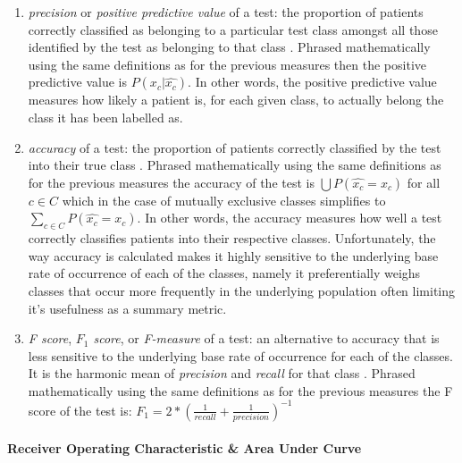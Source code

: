 \documentclass[]{article}
\begin{document}
\begin{enumerate}[label=\alph*)]
	\item \textit{precision} or \textit{positive predictive value} of a test: the proportion of patients correctly classified as belonging to a particular test class amongst all those identified by the test as belonging to that class \cite{Flach2004,Gung2013,Sokolova2009,Forman2010,VanAsch2013}. Phrased mathematically using the same definitions as for the previous measures then the positive predictive value is $P(x_c|\hat{x_c})$. In other words, the positive predictive value measures how likely a patient is, for each given class, to actually belong the class it has been labelled as.
	\item \textit{accuracy} of a test: the proportion of patients correctly classified by the test into their true class \cite{Flach2004,MedCalc2017,Sokolova2009,Forman2010,VanAsch2013}. Phrased mathematically using the same definitions as for the previous measures the accuracy of the test is $\bigcup P(\hat{x_c} = x_c)$ for all $c\in C$ which in the case of mutually exclusive classes simplifies to $\sum\limits_{c\in C}P(\hat{x_c} = x_c)$. In other words, the accuracy measures how well a test correctly classifies patients into their respective classes. Unfortunately, the way accuracy is calculated makes it highly sensitive to the underlying base rate of occurrence of each of the classes, namely it preferentially weighs classes that occur more frequently in the underlying population often limiting it's usefulness as a summary metric.
	\item \textit{F score}, \textit{$F_1$ score}, or \textit{F-measure} of a test: an alternative to accuracy that is less sensitive to the underlying base rate of occurrence for each of the classes. It is the harmonic mean of \textit{precision} and \textit{recall} for that class \cite{Flach2004,MedCalc2017,Sokolova2009,Forman2010,VanAsch2013}. Phrased mathematically using the same definitions as for the previous measures the F score of the test is: \newline$F_1 = 2*(\frac{1}{\textit{recall}} + \frac{1}{\textit{precision}})^{-1}$
\end{enumerate}

\paragraph{Receiver Operating Characteristic \& Area Under Curve}
\end{document}
